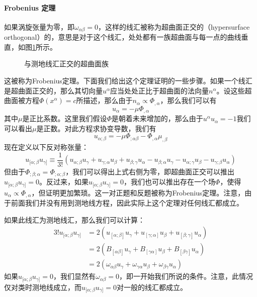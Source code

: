 \documentclass[hyperref, UTF8, a4paper]{ctexart}
\begin{document}
\paragraph{Frobenius 定理}

如果涡旋张量为零，即$\omega _{\alpha \beta } =0$，这样的线汇被称为超曲面正交的（hypersurface orthogonal）的，意思是对于这个线汇，处处都有一族超曲面与每一点的曲线垂直，如图\ref{fig:hypersurface_orthogonal}所示。

\begin{figure}
	\centering
	
	\caption{与测地线汇正交的超曲面族}
	\label{fig:hypersurface_orthogonal}
\end{figure}


这被称为Frobenius定理。下面我们给出这个定理证明的一些步骤。如果一个线汇是超曲面正交的，那么其切向量$u^{\alpha }$应当处处正比于超曲面的法向量$n^{\alpha }$。设这些超曲面被方程$\Phi (x^{\alpha } )=c$所描述，那么由于$n_{\alpha } \varpropto \Phi _{,\alpha }$，那么我们可以有
\begin{equation*}
	u_{\alpha } =-\mu \Phi _{,\alpha }
\end{equation*}
其中$\mu $是正比系数。这里我们假设$\Phi $是朝着未来增加的，那么由于$u^{\alpha } u_{\alpha } =-1$我们可以看出$\mu $是正数。对此方程求协变导数，我们有
\begin{equation*}
	u_{\alpha ;\beta } =-\mu \Phi _{;\alpha \beta } -\Phi _{,\alpha } \mu _{,\beta }
\end{equation*}
现在定义以下反对称张量：
\begin{equation*}
	u_{[ \alpha ;\beta } u_{\gamma ]} \equiv \frac{1}{3!}( u_{\alpha ;\beta } u_{\gamma } +u_{\gamma ;\alpha } u_{\beta } +u_{\beta ;\gamma } u_{\alpha } -u_{\beta ;\alpha } u_{\gamma } -u_{\alpha ;\gamma } u_{\beta } -u_{\gamma ;\beta } u_{\alpha })
\end{equation*}
但由于$\Phi _{;\beta ;\alpha } =\Phi _{;\alpha ;\beta }$，我们可以得出上式右侧为零，即超曲面正交可以推出$u_{[ \alpha ;\beta } u_{\gamma ]} =0$。反过来，如果$u_{[ \alpha ;\beta } u_{\gamma ]} =0$，我们也可以推出存在一个场$\Phi $，使得$u_{\alpha } \varpropto \Phi _{,\alpha }$，但证明更加繁琐。这一对正题和反题被称为Frobenius定理。注意，由于前面我们并没有用到测地线方程，因此实际上这个定理对任何线汇都成立。

如果此线汇为测地线汇，那么我们可以计算：
\begin{equation*}
	\begin{aligned}
		3!u_{[ \alpha ;\beta } u_{\gamma ]} & =2( u_{[ \alpha ;\beta ]} u_{\gamma } +u_{[ \gamma ;\alpha ]} u_{\beta } +u_{[ \beta ;\gamma ]} u_{\alpha })\\
		& =2( B_{[ \alpha \beta ]} u_{\gamma } +B_{[ \gamma \alpha ]} u_{\beta } +B_{[ \beta \gamma ]} u_{\alpha })\\
		& =2( \omega _{\alpha \beta } u_{\gamma } +\omega _{\gamma \alpha } u_{\beta } +\omega _{\beta \gamma } u_{\alpha })
	\end{aligned}
\end{equation*}
如果$u_{[ \alpha ;\beta } u_{\gamma ]} =0$，我们显然有$\omega _{\alpha \beta } =0$，即一开始我们所说的条件。注意，此情况仅对类时测地线成立，而$u_{[ \alpha ;\beta } u_{\gamma ]} =0$对一般的线汇都成立。
\end{document}
